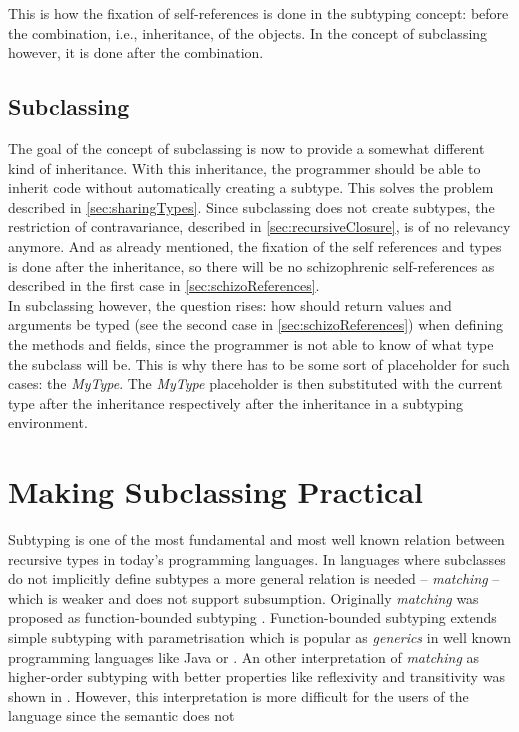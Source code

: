 This is how the fixation of self-references is done in the subtyping
concept: before the combination, i.e., inheritance, of the objects. In the
concept of subclassing however, it is done after the combination.

\subsection{Subclassing}
The goal of the concept of subclassing is now to provide a somewhat
different kind of inheritance. With this inheritance, the programmer
should be able to inherit code without automatically creating a subtype.
This solves the problem described in \cref{sec:sharingTypes}. Since
subclassing does not create subtypes, the restriction of contravariance,
described in \cref{sec:recursiveClosure}, is of no relevancy
anymore. And as already mentioned, the fixation of the self references
and types is done after the inheritance, so there will be no schizophrenic
self-references as described in the first case in \cref{sec:schizoReferences}.  
\\

In subclassing however, the question rises: how should return values and
arguments be typed (see the second case in \cref{sec:schizoReferences})
when defining the methods and fields, since the programmer is not able to
know of what type the subclass will be. This is why there has to be some
sort of placeholder for such cases: the \emph{MyType}. The \emph{MyType}
placeholder is then substituted with the current type after the
inheritance respectively after the inheritance in a subtyping environment.

\section{Making Subclassing Practical}
\label{ctr:makingSubclassingPractical}
Subtyping is one of the most fundamental and most well known relation
between recursive types in today's programming languages. In languages
where subclasses do not implicitly define subtypes a more general
relation is needed -- \emph{matching} -- which is weaker and does
not support subsumption. Originally \emph{matching} was proposed
as function-bounded subtyping \cite{canning_f-bounded_1989}. Function-bounded
subtyping extends simple subtyping with parametrisation which is popular as
\emph{generics} in well known programming languages like Java or \cs
\cite{barron-estrada_inheritance_2003}. An other interpretation of
\emph{matching} as higher-order subtyping with better properties like
reflexivity and transitivity was shown in \cite{abadi_subtyping_1996}. However,
this interpretation is more difficult for the users of the language since
the semantic does not 

